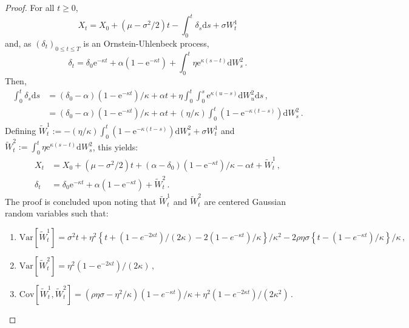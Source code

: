 \documentclass[nolayout]{article}
\theoremstyle{plain}
\theoremstyle{definition}
\newcommand{\1}{\mathbbm{1}}
\def\rmd{\mathrm{d}}
\def\rme{\mathrm{e}}
\def\eqsp{\,}
\newcommand{\eqdef}{\ensuremath{:=}}
\begin{document}
\begin{proof}
For all $t\ge 0$,
\[
X_t = X_0 + (\mu-\sigma^2/2)t - \int_0^t\delta_s\rmd s +\sigma W_t^1
\]
and, as $(\delta_t)_{0\le t\le T}$ is an Ornstein-Uhlenbeck process,
\[
\delta_t = \delta_0\rme^{-\kappa t} + \alpha(1-\rme^{-\kappa t}) + \int_0^t \eta \rme^{\kappa(s-t)}\rmd W^2_s\eqsp.
\]
Then,
\begin{align*}
\int_0^t\delta_s\rmd s &= (\delta_0-\alpha)(1-\rme^{-\kappa t})/\kappa + \alpha t + \eta\int_0^t\int_0^s\rme^{\kappa(u-s)}\rmd W^2_u\rmd s\eqsp,\\
&=(\delta_0-\alpha)(1-\rme^{-\kappa t})/\kappa + \alpha t + (\eta/\kappa) \int_0^t (1-\rme^{-\kappa (t-s)}) \rmd W^2_s\eqsp.
\end{align*}
Defining $\tilde{W}^1_t \eqdef - (\eta/\kappa) \int_0^t (1-\rme^{-\kappa (t-s)}) \rmd W^2_s+\sigma W_t^1$ and $\tilde{W}_t^2\eqdef \int_0^t \eta \rme^{\kappa(s-t)}\rmd W^2_s$, this yields:
\begin{align*}
X_t &= X_0 +  (\mu-\sigma^2/2)t + (\alpha-\delta_0)(1-\rme^{-\kappa t})/\kappa - \alpha t + \tilde{W}_t^1\eqsp,\\
\delta_t &= \delta_0\rme^{-\kappa t} + \alpha(1-\rme^{-\kappa t}) + \tilde{W}^2_t\eqsp.
\end{align*}
The proof is concluded upon noting that $\tilde{W}^1_t$ and $\tilde{W}^2_t$ are centered Gaussian random variables such that:
\begin{enumerate}[-]
\item $\!\!\mathrm{Var}\left[\tilde{W}^1_t\right] = \sigma^2  t + \eta^2\left\{ t + (1-e^{-2\kappa t})/(2\kappa) - 2(1-e^{-\kappa  t})/\kappa\right\}/\kappa^2 - 2\rho \eta \sigma\left\{ t - (1-e^{-\kappa  t})/\kappa \right\}/\kappa\eqsp,$
\item $\!\!\mathrm{Var}\left[\tilde{W}^2_t\right] = \eta^2(1-\rme^{-2\kappa t})/(2\kappa)\eqsp,$
\item $\!\!\mathrm{Cov}\left[\tilde{W}^1_t,\tilde{W}^2_t\right] = \left(\rho \eta\sigma-\eta^2/\kappa\right)\left(1-e^{-\kappa t} \right)/\kappa + \eta^2 \left(1-e^{-2\kappa t} \right)/(2\kappa^2)\eqsp.$
\end{enumerate}
\end{proof}


\end{document}

